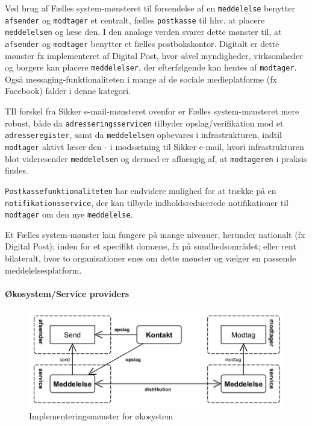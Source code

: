 Ved brug af Fælles system-mønsteret til forsendelse af en
\texttt{meddelelse} benytter \texttt{afsender} og \texttt{modtager} et
centralt, fælles \texttt{postkasse} til hhv. at placere
\texttt{meddelelsen} og læse den. I den analoge verden svarer dette
mønster til, at \texttt{afsender} og \texttt{modtager} benytter et
fælles postbokskontor. Digitalt er dette mønster fx implementeret af
Digital Post, hvor såvel myndigheder, virksomheder og borgere kan
placere \texttt{meddelelser}, der efterfølgende kan hentes af
\texttt{modtager}. Også messaging-funktionaliteten i mange af de sociale
medieplatforme (fx Facebook) falder i denne kategori.

TIl forskel fra Sikker e-mail-mønsteret ovenfor er Fælles
system-mønsteret mere robust, både da \texttt{adresseringsservicen}
tilbyder opslag/verifikation mod et \texttt{adresseregister}, samt da
\texttt{meddelelsen} opbevares i infrastrukturen, indtil
\texttt{modtager} aktivt læser den - i modsætning til Sikker e-mail,
hvori infrastrukturen blot videresender \texttt{meddelelsen} og dermed
er afhængig af, at \texttt{modtageren} i praksis findes.

\texttt{Postkassefunktionaliteten} har endvidere mulighed for at trække
på en \texttt{notifikationsservice}, der kan tilbyde indholdsreducerede
notifikationer til \texttt{modtager} om den nye \texttt{meddelelse}.

Et Fælles system-mønster kan fungere på mange niveauer, herunder
nationalt (fx Digital Post); inden for et specifikt domæne, fx på
sundhedsområdet; eller rent bilateralt, hvor to organisationer enes om
dette mønster og vælger en passende meddelelsesplatform.

\paragraph{Økosystem/Service
providers}\label{uxf8kosystemservice-providers}

\begin{figure}
\centering
\includegraphics{figures/send-eco.png}
\caption{Implementeringsmønster for økosystem}
\end{figure}

